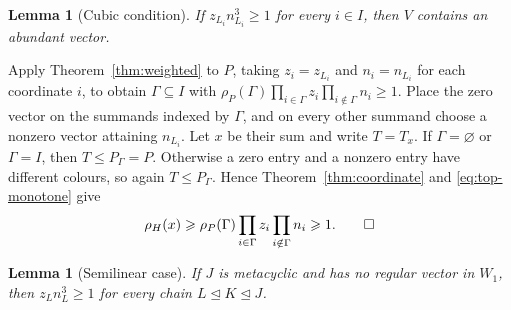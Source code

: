 \documentclass[10pt]{amsart}
\newtheorem{lemma}[theorem]{Lemma}
\theoremstyle{definition}
\renewcommand{\ge}{\geqslant}
\renewcommand{\leq}{\leqslant}
\renewcommand{\geq}{\geqslant}
\let\oldendproof\endproof
\renewenvironment{proof}[1][\proofname]{%
  \oldproof[\bfseries #1]%
}{\oldendproof}
\numberwithin{equation}{section}
\numberwithin{table}{section}
\begin{document}
\begin{lemma}[Cubic condition]\label{lem:branch-profile}
If $z_{L_i}n_{L_i}^{3}\geq1$ for every $i\in I$, then $V$ contains an
abundant vector.
\end{lemma}

\begin{proof}
Apply Theorem~\ref{thm:weighted} to $P$, taking $z_i=z_{L_i}$ and
$n_i=n_{L_i}$ for each coordinate $i$, to obtain $\Gamma\subseteq I$ with
$\rho_P(\Gamma)\prod_{i\in\Gamma}z_{i}\prod_{i\notin\Gamma}n_{i}\ge1$. Place
the zero vector on the summands indexed by $\Gamma$, and on every other
summand choose a nonzero vector attaining $n_{L_i}$. Let $x$ be their sum and
write $T=T_x$. If $\Gamma=\varnothing$ or $\Gamma=I$, then
$T\leq P_\Gamma=P$. Otherwise a zero entry and a nonzero entry have different
colours, so again $T\leq P_\Gamma$. Hence
Theorem~\ref{thm:coordinate} and \eqref{eq:top-monotone} give
\begin{equation*}
 \rho_H(x)\ge \rho_P(\Gamma)
 \prod_{i\in\Gamma}z_i\prod_{i\notin\Gamma}n_i\ge1.\qedhere
\end{equation*}
\end{proof}

\begin{lemma}[Semilinear case]\label{lem:branch-semilinear}
If $J$ is metacyclic and has no regular vector in $W_1$, then
$z_Ln_L^{3}\geq1$ for every chain
$L\trianglelefteq K\trianglelefteq J$.
\end{lemma}
\end{document}
